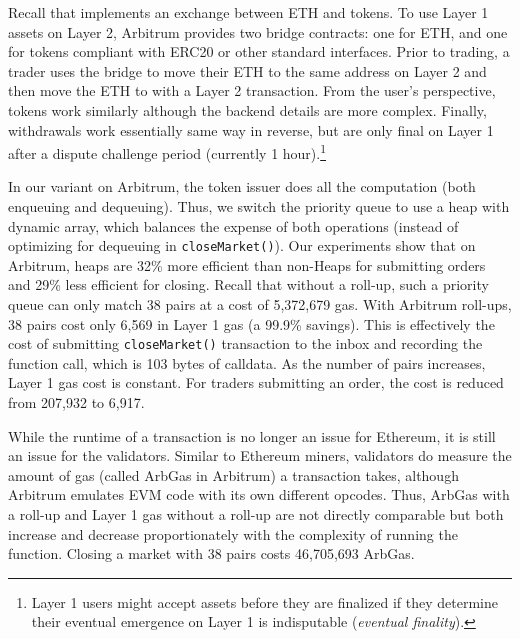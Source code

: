 Recall that \cm implements an exchange between ETH and tokens. To use Layer 1 assets on Layer 2, Arbitrum provides two bridge contracts: one for ETH, and one for tokens compliant with ERC20 or other standard interfaces. Prior to trading, a trader uses the bridge to move their ETH to the same address on Layer 2 and then move the ETH to \cm with a Layer 2 transaction. From the user's perspective, tokens work similarly although the backend details are more complex. Finally, withdrawals work essentially same way in reverse, but are only final on Layer 1 after a dispute challenge period (currently 1 hour).\footnote{Layer 1 users might accept assets before they are finalized if they determine their eventual emergence on Layer 1 is indisputable (\textit{eventual finality}).}

%


In our \cm variant on Arbitrum, the token issuer does all the computation (both enqueuing and dequeuing). Thus, we switch the priority queue to use a heap with dynamic array, which balances the expense of both operations (instead of optimizing for dequeuing in \texttt{closeMarket()}). Our experiments show that on Arbitrum, heaps are 32\% more efficient than non-Heaps for submitting orders and 29\% less efficient for closing. Recall that without a roll-up, such a priority queue can only match 38 pairs at a cost of 5,372,679 gas. With Arbitrum roll-ups, 38 pairs cost only 6,569 in Layer 1 gas (a 99.9\% savings). This is effectively the cost of submitting \texttt{closeMarket()} transaction to the inbox and recording the function call, which is 103 bytes of calldata. As the number of pairs increases, Layer 1 gas cost is constant. For traders submitting an order, the cost is reduced from  207,932 to 6,917.


While the runtime of a transaction is no longer an issue for Ethereum, it is still an issue for the validators. Similar to Ethereum miners, validators do measure the amount of gas (called ArbGas in Arbitrum) a transaction takes, although Arbitrum emulates EVM code with its own different opcodes. Thus, ArbGas with a roll-up and Layer 1 gas without a roll-up are not directly comparable but both increase and decrease proportionately with the complexity of running the function. Closing a market with 38 pairs costs 46,705,693 ArbGas. %


